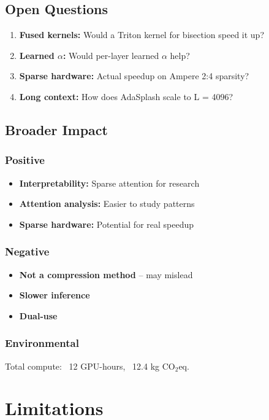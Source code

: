 \subsection{Open Questions}

\begin{enumerate}
\item \textbf{Fused kernels:} Would a Triton kernel for bisection speed it up?
\item \textbf{Learned $\alpha$:} Would per-layer learned $\alpha$ help?
\item \textbf{Sparse hardware:} Actual speedup on Ampere 2:4 sparsity?
\item \textbf{Long context:} How does AdaSplash scale to L = 4096?

\end{enumerate}
\subsection{Broader Impact}

\subsubsection{Positive}
\begin{itemize}
\item \textbf{Interpretability:} Sparse attention for research
\item \textbf{Attention analysis:} Easier to study patterns
\item \textbf{Sparse hardware:} Potential for real speedup

\end{itemize}
\subsubsection{Negative}
\begin{itemize}
\item \textbf{Not a compression method} -- may mislead
\item \textbf{Slower inference}
\item \textbf{Dual-use}

\end{itemize}
\subsubsection{Environmental}
Total compute: ~12 GPU-hours, ~12.4 kg CO$_2$eq.


\section{Limitations}

